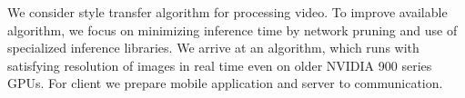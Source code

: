 \documentclass[../Main.tex]{subfiles}
\begin{document}
We consider style transfer algorithm for processing video. 
To improve available algorithm, we focus on minimizing inference time by
network pruning and use of specialized inference libraries. We arrive at an algorithm, 
which runs with satisfying resolution of images in real time even on older
NVIDIA 900 series GPUs. For client we prepare mobile application and server to communication.

\par\vspace*{\fill} %


\biblio %
\end{document}

